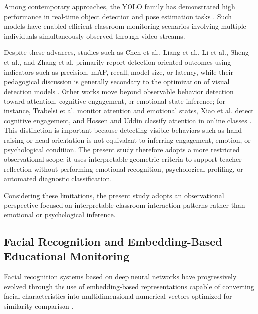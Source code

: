 \documentclass[12pt,a4paper]{article}
\begin{document}
Among contemporary approaches, the YOLO family has demonstrated high performance in real-time object detection and pose estimation tasks \cite{liangYOLObasedBehaviorDetection2025,liRealTimeClassroomBehavior2025}. Such models have enabled efficient classroom monitoring scenarios involving multiple individuals simultaneously observed through video streams.

Despite these advances, studies such as Chen et al., Liang et al., Li et al., Sheng et al., and Zhang et al. primarily report detection-oriented outcomes using indicators such as precision, mAP, recall, model size, or latency, while their pedagogical discussion is generally secondary to the optimization of visual detection models \cite{chenStudentBehaviorDetection2023,liangYOLObasedBehaviorDetection2025,liRealTimeClassroomBehavior2025,shengRealtimeClassroomStudent2025,zhangClassroomBehaviorDetection2025}. Other works move beyond observable behavior detection toward attention, cognitive engagement, or emotional-state inference; for instance, Trabelsi et al. monitor attention and emotional states, Xiao et al. detect cognitive engagement, and Hossen and Uddin classify attention in online classes \cite{trabelsiRealTimeAttentionMonitoring2023a,xiaoOcclusionRobustCognitive2024,hossenAttentionMonitoringStudents2023}. This distinction is important because detecting visible behaviors such as hand-raising or head orientation is not equivalent to inferring engagement, emotion, or psychological condition. The present study therefore adopts a more restricted observational scope: it uses interpretable geometric criteria to support teacher reflection without performing emotional recognition, psychological profiling, or automated diagnostic classification.

Considering these limitations, the present study adopts an observational perspective focused on interpretable classroom interaction patterns rather than emotional or psychological inference.

\subsection{Facial Recognition and Embedding-Based Educational Monitoring}
Facial recognition systems based on deep neural networks have progressively evolved through the use of embedding-based representations capable of converting facial characteristics into multidimensional numerical vectors optimized for similarity comparison \cite{schroffFaceNetUnifiedEmbedding2015,dengArcFaceAdditiveAngular}.
\end{document}
